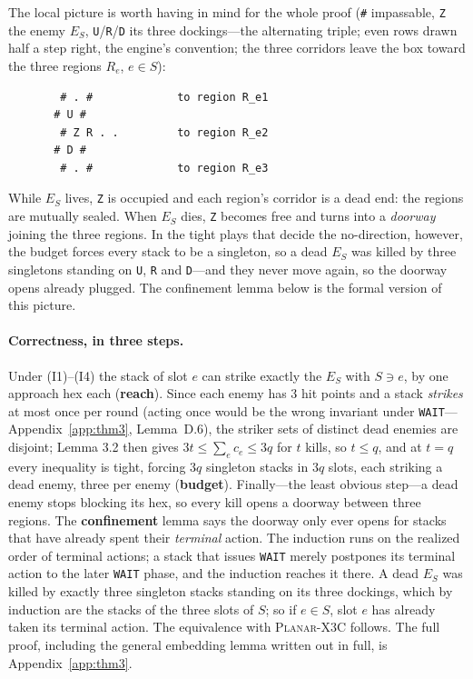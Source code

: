 \documentclass[11pt,a4paper]{article}
\theoremstyle{plain}
\theoremstyle{definition}
\theoremstyle{plain}
\theoremstyle{definition}
\theoremstyle{remark}
\newcommand{\PX}{\textsc{Planar-X3C}}
\begin{document}
The local picture is worth having in mind for the whole proof (\texttt{\#} impassable,
\texttt{Z} the enemy $E_S$, \texttt{U}/\texttt{R}/\texttt{D} its three dockings---the
alternating triple; even rows drawn half a step right, the engine's convention; the three
corridors leave the box toward the three regions $R_e$, $e\in S$):

\begin{verbatim}
        # . #             to region R_e1
       # U #
        # Z R . .         to region R_e2
       # D #
        # . #             to region R_e3
\end{verbatim}

While $E_S$ lives, \texttt{Z} is occupied and each region's corridor is a dead end: the regions
are mutually sealed. When $E_S$ dies, \texttt{Z} becomes free and turns into a \emph{doorway} joining
the three regions. In the tight plays that decide the no-direction, however, the budget forces
every stack to be a singleton, so a dead $E_S$ was killed by three singletons standing on
\texttt{U}, \texttt{R} and \texttt{D}---and they never move again, so the doorway opens already
plugged. The confinement lemma below is the formal version of this picture.

\paragraph{Correctness, in three steps.} Under (I1)--(I4) the stack of slot $e$ can strike
exactly the $E_S$ with $S\ni e$, by one approach hex each (\textbf{reach}). Since each enemy has
3 hit points and a stack \emph{strikes} at most once per round (acting once would be the
wrong invariant under \texttt{WAIT}---Appendix~\ref{app:thm3}, Lemma~D.6), the striker sets of
distinct dead enemies are disjoint;
Lemma 3.2 then gives $3t\le\sum_e c_e\le 3q$ for $t$ kills, so $t\le q$, and at $t=q$ every
inequality is tight, forcing $3q$ singleton stacks in $3q$ slots, each striking a dead enemy,
three per enemy (\textbf{budget}). Finally---the least obvious step---a dead enemy stops
blocking its hex, so every kill opens a doorway between three regions. The \textbf{confinement}
lemma says the doorway only ever opens for stacks that have already spent their
\emph{terminal} action. The induction runs on the realized order of terminal actions; a stack
that issues \texttt{WAIT} merely postpones its terminal action to the later \texttt{WAIT}
phase, and the induction reaches it there. A dead $E_S$ was killed by exactly three singleton
stacks standing on its three dockings, which by induction are the stacks of the three slots of
$S$; so if $e\in S$, slot $e$ has already taken its terminal action. The equivalence with
\PX{} follows. The full proof, including
the general embedding lemma written out in full, is Appendix~\ref{app:thm3}.
\end{document}
